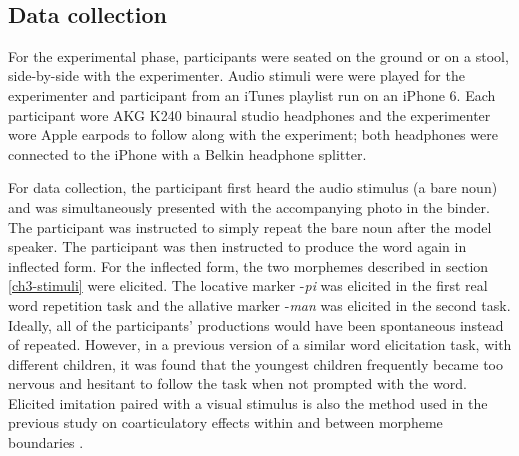\documentclass[a4paper,man,floatsintext,natbib,donotrepeattitle, apacite]{apa6}
\begin{document}
~
~

\subsection{Data collection}

For the experimental phase, participants were seated on the ground or on a stool, side-by-side with the experimenter. Audio stimuli were were played for the experimenter and participant from an iTunes playlist run on an iPhone 6. Each participant wore AKG K240 binaural studio headphones and the experimenter wore Apple earpods to follow along with the experiment; both headphones were connected to the iPhone with a Belkin headphone splitter. 

For data collection, the participant first heard the audio stimulus (a bare noun) and was simultaneously presented with the accompanying photo in the binder. The participant was instructed to simply repeat the bare noun after the model speaker. The participant was then instructed to produce the word again in inflected form. For the inflected form, the two morphemes described in section \ref{ch3-stimuli} were elicited. The locative marker -\textit{pi} was elicited in the first real word repetition task and the allative marker -\textit{man} was elicited in the second task. Ideally, all of the participants' productions would have been spontaneous instead of repeated. However, in a previous version of a similar word elicitation task, with different children, it was found that the youngest children frequently became too nervous and hesitant to follow the task when not prompted with the word. Elicited imitation paired with a visual stimulus is also the method used in the previous study on coarticulatory effects within and between morpheme boundaries \citep{songEffectsCoarticulationMorphological2013}.   
\end{document}
